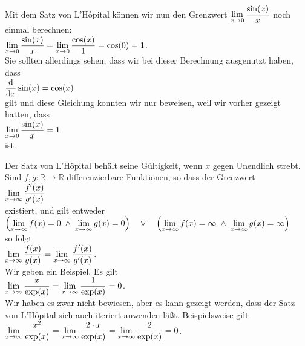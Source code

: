 \example
Mit dem Satz von L'H\^opital k\"onnen wir nun den Grenzwert
$\displaystyle\lim\limits_{x \rightarrow 0} \frac{\sin(x)}{x}$ noch einmal berechnen: 
\\[0.1cm]
\hspace*{1.3cm} $\displaystyle\lim\limits_{x \rightarrow 0} \frac{\sin(x)}{x} = \lim\limits_{x \rightarrow 0}
\frac{\cos(x)}{1} = \cos(0) = 1$.
\\[0.2cm]
Sie sollten allerdings sehen, dass wir bei dieser Berechnung ausgenutzt haben, dass
\\[0.2cm]
\hspace*{1.3cm}
$\displaystyle\frac{\textrm{d}}{\textrm{d}x}\sin(x) = \cos(x)$
\\[0.2cm]
gilt und diese Gleichung konnten wir nur beweisen, weil wir vorher gezeigt hatten, dass
\\[0.2cm]
\hspace*{1.3cm}
$\displaystyle\lim\limits_{x \rightarrow 0} \frac{\sin(x)}{x} = 1$
\\[0.2cm]
ist.
\eox

\remark
Der Satz von L'H\^opital beh\"alt seine G\"ultigkeit, wenn $x$ gegen Unendlich strebt.  Sind 
$f,g:\mathbb{R} \rightarrow \mathbb{R}$ differenzierbare Funktionen, so dass der Grenzwert
\\[0.3cm]
\hspace*{1.3cm}
$\displaystyle\lim\limits_{x \rightarrow \infty} \frac{f'(x)}{g'(x)}$ 
\\[0.3cm]
existiert, und gilt entweder 
\\[0.3cm]
\hspace*{0.3cm}
$\Bigl(\lim\limits_{x \rightarrow \infty} f(x) = 0 \;\wedge\; \lim\limits_{x \rightarrow \infty} g(x) = 0\Bigr) \quad \vee \quad
 \Bigl(\lim\limits_{x \rightarrow \infty} f(x) = \infty \;\wedge\;\lim\limits_{x \rightarrow \infty} g(x) = \infty\Bigr)$ 
\\[0.3cm]
so folgt
\\
\hspace*{1.3cm}
$\displaystyle\lim\limits_{x \rightarrow \infty} \frac{f(x)}{g(x)} = \lim\limits_{x \rightarrow \infty} \frac{f'(x)}{g'(x)}$.
\\[0.3cm]
Wir geben ein Beispiel.  Es gilt 
\\[0.3cm]
\hspace*{1.3cm}
$\displaystyle\lim\limits_{x \rightarrow \infty} \frac{x}{\exp(x)} = \lim\limits_{x \rightarrow \infty} \frac{1}{\exp(x)} = 0$.
\\[0.3cm]
Wir haben es zwar nicht bewiesen, aber es kann gezeigt werden, dass der Satz von L'H\^opital  sich
auch iteriert anwenden l\"a{\ss}t.  Beispielsweise gilt
\\[0.3cm]
\hspace*{1.3cm}
$\displaystyle\lim\limits_{x \rightarrow \infty} \frac{x^2}{\exp(x)} = \lim\limits_{x \rightarrow \infty}
\frac{2\cdot x}{\exp(x)} =\lim\limits_{x \rightarrow \infty} \frac{2}{\exp(x)} = 0$. \eox

